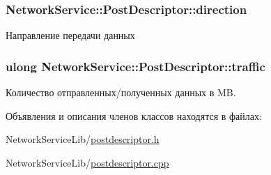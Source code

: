 \subsubsection[{direction}]{ Network\+Service\+::\+Post\+Descriptor\+::direction\hspace{0.3cm}{\ttfamily [private]}}\label{class_network_service_1_1_post_descriptor_a04faf66e747b2d4f2d89bf1e92f4ab5c}


Направление передачи данных 

\hypertarget{class_network_service_1_1_post_descriptor_ae2eef559828a42ec299ab59711f88e59}{}
\subsubsection[{traffic}]{\setlength{\rightskip}{0pt plus 5cm}ulong Network\+Service\+::\+Post\+Descriptor\+::traffic\hspace{0.3cm}{\ttfamily [private]}}\label{class_network_service_1_1_post_descriptor_ae2eef559828a42ec299ab59711f88e59}


Количество отправленных/полученных данных в M\+B. 



Объявления и описания членов классов находятся в файлах\+:\begin{DoxyCompactItemize}
\item 
Network\+Service\+Lib/\hyperlink{postdescriptor_8h}{postdescriptor.\+h}\item 
Network\+Service\+Lib/\hyperlink{postdescriptor_8cpp}{postdescriptor.\+cpp}\end{DoxyCompactItemize}
